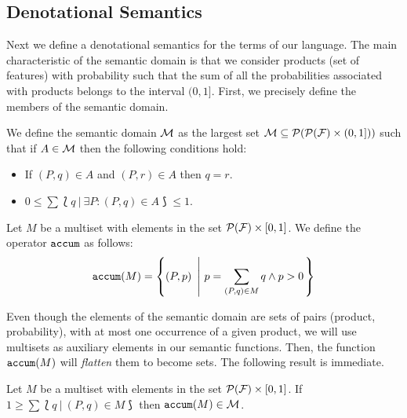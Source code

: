 \subsection{Denotational Semantics}
\label{sec:stat:den}

Next we define a denotational semantics for the terms of our language. The main characteristic of the semantic domain is that we consider products (set of features) with probability such that the sum of all the probabilities associated with products belongs to the interval $(0,1]$. First, we
precisely define the members of the semantic domain.


\bdfn\label{def:den:pr}
We define the semantic domain ${\cal M}$ as the largest set ${\cal M}\subseteq{\cal P}({\cal P}({\cal F})\times
  (0,1]))$ such that if $A\in{\cal M}$ then the following
  conditions hold:
  \begin{itemize}
  \item If $(P,q)\in A$ and $(P,r)\in A$ then $q=r$.
  \item $0\leq \sum \lbag q \ | \ \exists P: (P,q)\in A\rbag \leq 1$.
  \end{itemize}


Let $M$ be a multiset  with elements in the set ${\cal P}({\cal F})\times [0,1]$.
We define the operator $\mathtt{accum}$ as follows:
  $$\accum(M) = \left\{(P,p)\ \left| \ p=\sum_{(P,q)\in M}q \wedge p>0\right. \right\}$$
\edfn

Even though the elements of the semantic domain are sets of pairs (product, probability), with at most one occurrence of a given product, we will use multisets as auxiliary elements in our semantic functions. Then, the function $\mathtt{accum}(M)$ will \emph{flatten} them to become sets.
The following result is immediate.

\bprop\label{prop:pr:accum}
 Let $M$ be a multiset with elements in the set ${\cal P}({\cal F})\times
 [0,1]$. If $1\geq\sum\lbag q\ |\ (P,q)\in M\rbag$
 then $\mathtt{accum}(M)\in{\cal M}$.
\eprop


